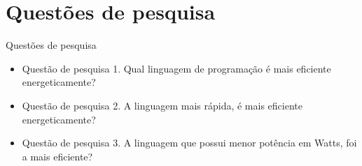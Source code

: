 \section{Questões de pesquisa}

\begin{frame}{Questões de pesquisa}
    \begin{itemize}
        \item Questão de pesquisa 1. Qual linguagem de programação é mais eficiente energeticamente?
        \item Questão de pesquisa 2. A linguagem mais rápida, é mais eficiente energeticamente? 
        \item Questão de pesquisa 3. A linguagem que possui menor potência em Watts, foi a mais eficiente?
    \end{itemize}
\end{frame}

